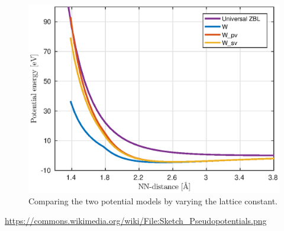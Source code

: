 \documentclass{article}
\begin{document}
\begin{figure}[H]
  \centering
  \includegraphics[scale=0.82]{img/pot-comp-compr2.eps}
  \caption{Comparing the two potential models by varying the lattice constant.}
  \label{fig:compr-comp}
\end{figure}

\begin{thebibliography}{100}
 \url{https://commons.wikimedia.org/wiki/File:Sketch_Pseudopotentials.png}
\end{thebibliography}
\end{document}
